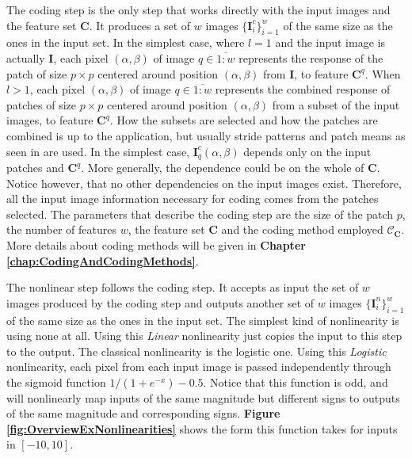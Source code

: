 \documentclass[12pt,a4paper,oneside,english]{UPBThesis}
\newcommand{\hctimes}[2]{{#1}\!\times\!{#2}}
\newcommand{\hcrange}[2]{\overline{{#1}\colon\!\!{#2}}}
\begin{document}
The coding step is the only step that works directly with the input images and the feature set $\textbf{C}$. It produces a set of $w$ images $\{\textbf{I}_i^c\}_{i=1}^{w}$ of the same size as the ones in the input set. In the simplest case, where $l=1$ and the input image is actually $\textbf{I}$, each pixel $(\alpha,\beta)$ of image $q \in \hcrange{1}{w}$ represents the response of the patch of size $\hctimes{p}{p}$ centered around position $(\alpha,\beta)$ from $\textbf{I}$, to feature $\textbf{C}^q$. When $l > 1$, each pixel $(\alpha,\beta)$ of image $q \in \hcrange{1}{w}$ represents the combined response of patches of size $\hctimes{p}{p}$ centered around position $(\alpha,\beta)$ from a subset of the input images, to feature $\textbf{C}^q$. How the subsets are selected and how the patches are combined is up to the application, but usually stride patterns and patch means as seen in \cite{gradient-based-learning} are used. In the simplest case, ${\textbf{I}_q^c}(\alpha,\beta)$ depends only on the input patches and $\textbf{C}^q$. More generally, the dependence could be on the whole of $\textbf{C}$. Notice however, that no other dependencies on the input images exist. Therefore, all the input image information necessary for coding comes from the patches selected. The parameters that describe the coding step are the size of the patch $p$, the number of features $w$, the feature set $\textbf{C}$ and the coding method employed $\mathcal{C}_{\textbf{C}}$. More details about coding methods will be given in \textbf{Chapter \ref{chap:CodingAndCodingMethods}}.

The nonlinear step follows the coding step. It accepts as input the set of $w$ images produced by the coding step and outputs another set of $w$ images $\{\textbf{I}_i^n\}_{i=1}^w$ of the same size as the ones in the input set. The simplest kind of nonlinearity is using none at all. Using this \emph{Linear} nonlinearity just copies the input to this step to the output. The classical nonlinearity is the logistic one. Using this \emph{Logistic} nonlinearity, each pixel from each input image is passed independently through the sigmoid function $1 / (1 + e^{-x}) - 0.5$. Notice that this function is odd, and will nonlinearly map inputs of the same magnitude but different signs to outputs of the same magnitude and corresponding signs. \textbf{Figure \ref{fig:OverviewExNonlinearities}} shows the form this function takes for inputs in $[-10,10]$.
\end{document}
